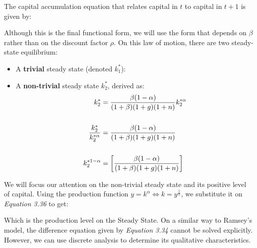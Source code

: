 \bigskip
The capital accumulation equation that relates capital in $t$ to capital in $t+1$ is given by:

\bigskip
Although this is the final functional form, we will use the form that depends on $\beta$ rather than on the discount factor $\rho$. On this law of motion, there are two steady-state equilibrium:
\begin{itemize}
\item A \textbf{trivial} steady state (denoted $k_1^*$):
\item A \textbf{non-trivial} steady state $k_2^*$, derived as:
\begin{align*}
k_2^* &= \dfrac{\beta(1-\alpha)}{(1+\beta)(1+g)(1+n)} k_2^{*\alpha} \\
\\
\dfrac{k_2^{*}}{k_2^{*\alpha}} &= \dfrac{\beta(1-\alpha)}{(1+\beta)(1+g)(1+n)} \\ 
\\
k_2^{*1-\alpha} &= \left[ \dfrac{\beta(1-\alpha)}{(1+\beta)(1+g)(1+n)} \right] 
\end{align*}
\bigskip
{}
\end{itemize}

\bigskip
We will focus our attention on the non-trivial steady state and its positive level of capital. Using the production function $y=k^\alpha \Leftrightarrow k=y^{\frac{1}{\alpha}}$, we substitute it on \textit{Equation 3.36} to get:

\bigskip
Which is the production level on the Steady State. On a similar way to Ramsey's model, the difference equation given by \textit{Equation 3.34} cannot be solved explicitly. However, we can use discrete analysis to determine its qualitative characteristics.\\


